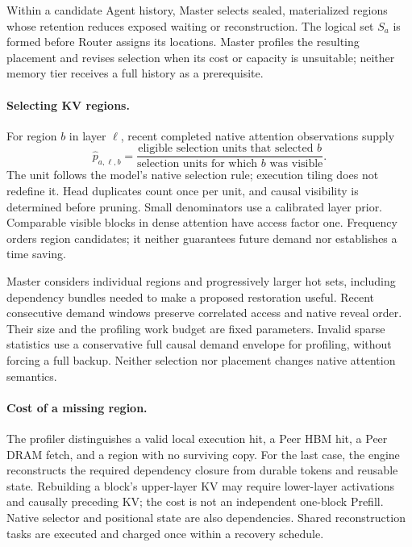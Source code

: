 Within a candidate Agent history, Master selects sealed, materialized
regions whose retention reduces exposed waiting or reconstruction.
The logical set $S_a$ is formed before Router assigns its locations.
Master profiles the resulting placement and revises selection when its
cost or capacity is unsuitable; neither memory tier receives a full
history as a prerequisite.

\paragraph{Selecting KV regions.}
For region $b$ in layer $\ell$, recent completed native attention
observations supply
\begin{equation}
 \widehat p_{a,\ell,b}=
 \frac{\text{eligible selection units that selected }b}
      {\text{selection units for which }b\text{ was visible}}.
 \label{eq:demand}
\end{equation}
The unit follows the model's native selection rule; execution tiling
does not redefine it. Head duplicates count once per unit, and causal
visibility is determined before pruning. Small denominators use a
calibrated layer prior. Comparable visible blocks in dense attention
have access factor one. Frequency orders region candidates; it neither
guarantees future demand nor establishes a time saving.

Master considers individual regions and progressively larger hot sets,
including dependency bundles needed to make a proposed restoration
useful. Recent consecutive demand windows preserve correlated access
and native reveal order. Their size and the profiling work budget are
fixed parameters. Invalid sparse statistics use a conservative full
causal demand envelope for profiling, without forcing a full backup.
Neither selection nor placement changes native attention semantics.

\paragraph{Cost of a missing region.}
The profiler distinguishes a valid local execution hit, a Peer HBM hit, a
Peer DRAM fetch, and a region with no surviving copy. For the last case,
the engine reconstructs the required dependency closure from durable
tokens and reusable state. Rebuilding a block's upper-layer KV may
require lower-layer activations and causally preceding KV; the cost is
not an independent one-block Prefill. Native selector and positional
state are also dependencies. Shared reconstruction tasks are executed
and charged once within a recovery schedule.

